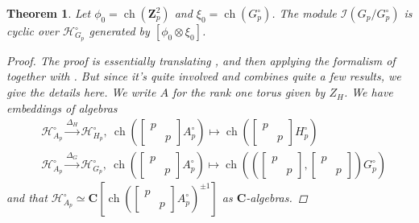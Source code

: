 \documentclass{amsart}%
\theoremstyle{plain}
\newtheorem{thm}{Theorem}[subsection]
\theoremstyle{plain}
\theoremstyle{remark}
\DeclareMathOperator{\ch}{ch}
\begin{document}
\begin{thm}\label{thm cyclicity on coinvariants}
    Let $\phi_0=\ch(\mathbf{Z}_p^2)$ and $\xi_0=\ch(G_p^\circ)$. The module $\mathcal{I}(G_p/G_p^\circ)$ is cyclic over $\mathcal{H}_{G_p}^\circ$ generated by $[\phi_0\otimes \xi_0]$.
    \begin{proof}
        The proof is essentially translating \cite[Lemma $4.3.3$ \& Proposition $4.3.4$]{Loeffler_2021}, and then applying the formalism of \cite[Theorem $4.3.6$]{Loeffler_2021} together with . But since it's quite involved and combines quite a few results, we give the details here. We write $A$ for the rank one torus given by $Z_H$. We have embeddings of algebras \begin{align*}&\mathcal{H}_{A_p}^\circ\overset{\Delta_H}{\longrightarrow} \mathcal{H}_{H_p}^\circ,\ \ch(\left[\begin{smallmatrix}
            p& \\
            & p
        \end{smallmatrix}\right] A_p^\circ)\mapsto \ch(\left[\begin{smallmatrix}
            p& \\
            & p
        \end{smallmatrix}\right] H_p^\circ)\\
        &\mathcal{H}_{A_p}^\circ\overset{\Delta_G}{\longrightarrow} \mathcal{H}_{G_p}^\circ,\ \ch(\left[\begin{smallmatrix}
            p& \\
            & p
        \end{smallmatrix}\right] A_p^\circ)\mapsto \ch((\left[\begin{smallmatrix}
            p& \\
            & p
        \end{smallmatrix}\right],\left[\begin{smallmatrix}
            p& \\
            & p
        \end{smallmatrix}\right])G_p^\circ)
        \end{align*}
        and that $\mathcal{H}_{A_p}^\circ\simeq \mathbf{C}[\ch(\left[\begin{smallmatrix}
            p & \\
            & p
        \end{smallmatrix}\right]A_p^\circ)^{\pm 1}]$ as $\mathbf{C}$-algebras.

\end{proof}
\end{thm}
\end{document}
